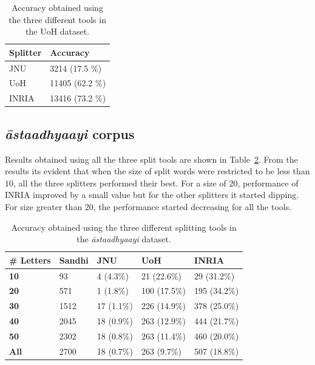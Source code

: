 \documentclass[11pt]{article}
\begin{document}
\begin{table}[h]
\begin{center}
\begin{tabular}{| l | l | }
\hline  \bf Splitter & \bf Accuracy \\
\hline
JNU & 3214 (17.5 \%) \\ \hline
UoH & 11405 (62.2 \%) \\ \hline
INRIA & 13416 (73.2 \%)\\ \hline
\end{tabular}
\end{center}
\caption{\label{ev_uo} Accuracy obtained using the three different tools in the UoH dataset. }
\end{table}


\subsection{\textit{\={a}staadhyaayi} corpus}
Results obtained using all the three split tools are shown in Table~\ref{ev_as}. From the results its evident that when the size of split words were restricted to be less than $10$, all the three splitters performed their best. For a size of $20$, performance of INRIA improved by a small value but for the other splitters it started dipping. For size greater than $20$, the performance started decreasing for all the tools. 
    

\begin{table}[h]
	\begin{center}
		\begin{tabular}{ |p{1.5cm}|  p{1.1cm}| p{0.8cm}| p{1.1cm}| p{1.1cm}| }
			\hline  
			\bf \# Letters & \bf Sandhi & \bf JNU & \bf UoH & \bf INRIA\\
			\hline
			\bf	10	&	93	&	4 (4.3\%)	&	21 (22.6\%)	&	29 (31.2\%)	\\	\hline
			\bf	20	&	571	&	1 (1.8\%)	&	100 (17.5\%)	&	195 (34.2\%)	\\	\hline
			\bf	30	&	1512	&	17 (1.1\%)	&	226 (14.9\%)	&	378 (25.0\%)	\\	\hline
			\bf	40	&	2045	&	18 (0.9\%)	&	263 (12.9\%)	&	444 (21.7\%)	\\	\hline
			\bf	50	&	2302	&	18 (0.8\%)	&	263 (11.4\%)	&	460 (20.0\%)	\\	\hline
			\bf	All	&	2700	&	18 (0.7\%)	&	263 (9.7\%)	&	507 (18.8\%)	\\	\hline
		\end{tabular}
	\end{center}
	\caption{\label{ev_as} Accuracy obtained using the three different splitting tools in the \textit{\={a}staadhyaayi} dataset.}
\end{table}
\end{document}
